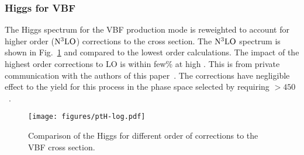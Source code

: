 


\subsubsection{Higgs \pt for VBF}
The Higgs \pt spectrum for the VBF production mode is reweighted to account for higher order (${\rm N^{3}LO}$) corrections to the cross section. The ${\rm N^{3}LO}$ \pt spectrum is shown in Fig.~\ref{fig:VBFpt} and compared to the lowest order calculations. The impact of the highest order corrections to LO is within few\% at high \pt. This is from private communication with the authors of this paper~\cite{Cacciari:2015jma}. The corrections have negligible effect to the yield for this process in the phase space selected by requiring \pt$>450$~\GeV. 

\begin{figure}[hbtp]\begin{center}
    \texttt{[image: figures/ptH-log.pdf]}
    \caption{Comparison of the Higgs \pt for different order of corrections to the VBF cross section.}
 \label{fig:VBFpt}
 \end{center}
 \end{figure}


